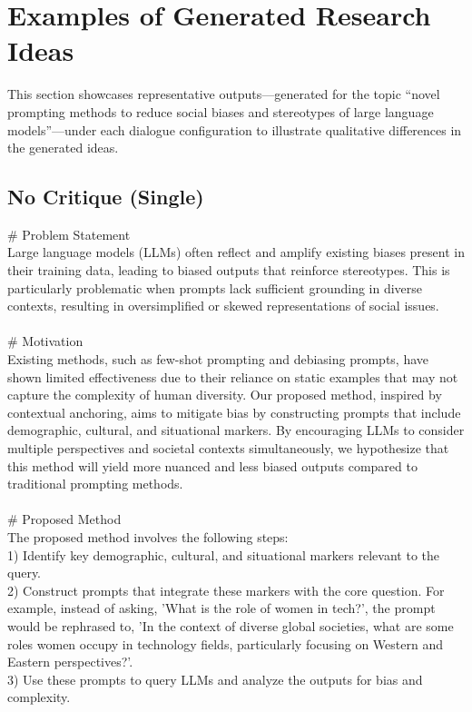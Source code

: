 \section{Examples of Generated Research Ideas}
This section showcases representative outputs—generated for the topic ``novel prompting methods to reduce social biases and stereotypes of large language models''—under each dialogue configuration to illustrate qualitative differences in the generated ideas.

\subsection{No Critique (Single)}
{\centering
\begin{tcolorbox}[
    colframe=green!50!black, 
    colback=green!10!white, 
    title=Contextual Anchoring: A Novel Prompting Method to Mitigate Bias in Large Language Models, 
    width=0.95\textwidth,
    boxsep=3pt
]
\# Problem Statement \\
Large language models (LLMs) often reflect and amplify existing biases present in their training data, leading to biased outputs that reinforce stereotypes. This is particularly problematic when prompts lack sufficient grounding in diverse contexts, resulting in oversimplified or skewed representations of social issues.
\\
\\
\# Motivation \\
Existing methods, such as few-shot prompting and debiasing prompts, have shown limited effectiveness due to their reliance on static examples that may not capture the complexity of human diversity. Our proposed method, inspired by contextual anchoring, aims to mitigate bias by constructing prompts that include demographic, cultural, and situational markers. By encouraging LLMs to consider multiple perspectives and societal contexts simultaneously, we hypothesize that this method will yield more nuanced and less biased outputs compared to traditional prompting methods.
\\
\\
\# Proposed Method \\
The proposed method involves the following steps: \\
1) Identify key demographic, cultural, and situational markers relevant to the query. \\
2) Construct prompts that integrate these markers with the core question. For example, instead of asking, 'What is the role of women in tech?', the prompt would be rephrased to, 'In the context of diverse global societies, what are some roles women occupy in technology fields, particularly focusing on Western and Eastern perspectives?'. \\
3) Use these prompts to query LLMs and analyze the outputs for bias and complexity.\\
\end{tcolorbox}
\par}
\clearpage

